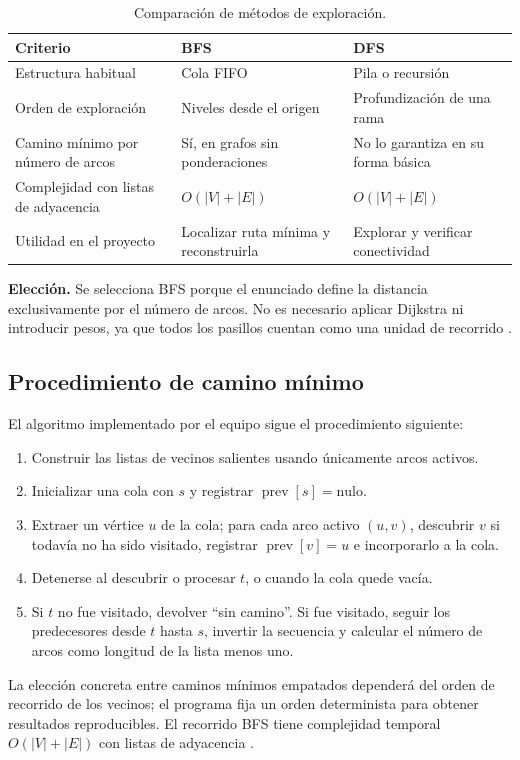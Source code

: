 \documentclass[11pt,a4paper]{article}
\begin{document}
\begin{table}[H]
\centering
\caption{Comparación de métodos de exploración.}
\begin{tabularx}{\textwidth}{>{\raggedright\arraybackslash}p{2.3cm}XX}
\toprule
Criterio & BFS & DFS \\
\midrule
Estructura habitual & Cola FIFO & Pila o recursión \\
Orden de exploración & Niveles desde el origen & Profundización de una rama \\
Camino mínimo por número de arcos & Sí, en grafos sin ponderaciones & No lo garantiza en su forma básica \\
Complejidad con listas de adyacencia & $O(|V|+|E|)$ & $O(|V|+|E|)$ \\
Utilidad en el proyecto & Localizar ruta mínima y reconstruirla & Explorar y verificar conectividad \\
\bottomrule
\end{tabularx}
\end{table}

\textbf{Elección.} Se selecciona BFS porque el enunciado define la distancia exclusivamente por el número de arcos. No es necesario aplicar Dijkstra ni introducir pesos, ya que todos los pasillos cuentan como una unidad de recorrido \cite{kleinberg2006}.

\subsection{Procedimiento de camino mínimo}
El algoritmo implementado por el equipo sigue el procedimiento siguiente:
\begin{enumerate}[label=\arabic*.]
\item Construir las listas de vecinos salientes usando únicamente arcos activos.
\item Inicializar una cola con $s$ y registrar $\operatorname{prev}[s]=\text{nulo}$.
\item Extraer un vértice $u$ de la cola; para cada arco activo $(u,v)$, descubrir $v$ si todavía no ha sido visitado, registrar $\operatorname{prev}[v]=u$ e incorporarlo a la cola.
\item Detenerse al descubrir o procesar $t$, o cuando la cola quede vacía.
\item Si $t$ no fue visitado, devolver \enquote{sin camino}. Si fue visitado, seguir los predecesores desde $t$ hasta $s$, invertir la secuencia y calcular el número de arcos como longitud de la lista menos uno.
\end{enumerate}
La elección concreta entre caminos mínimos empatados dependerá del orden de recorrido de los vecinos; el programa fija un orden determinista para obtener resultados reproducibles. El recorrido BFS tiene complejidad temporal $O(|V|+|E|)$ con listas de adyacencia \cite{kleinberg2006,sedgewick2011}.
\end{document}
